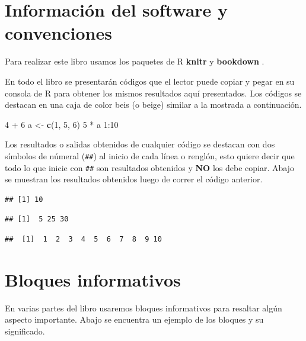 \documentclass[10pt,]{krantz}
\makeatletter
\newenvironment{Shaded}{\begin{snugshade}}{\end{snugshade}}
\newcommand{\KeywordTok}[1]{\textcolor[rgb]{0.13,0.29,0.53}{\textbf{{#1}}}}
\newcommand{\DecValTok}[1]{\textcolor[rgb]{0.00,0.00,0.81}{{#1}}}
\newcommand{\StringTok}[1]{\textcolor[rgb]{0.31,0.60,0.02}{{#1}}}
\newcommand{\NormalTok}[1]{{#1}}
\let\proglang=\textsf
\newenvironment{kframe}{%
\medskip{}
\setlength{\fboxsep}{.8em}
 \def\at@end@of@kframe{}%
 \ifinner\ifhmode%
  \def\at@end@of@kframe{\end{minipage}}%
  \begin{minipage}{\columnwidth}%
 \fi\fi%
 \def\FrameCommand##1{\hskip\@totalleftmargin \hskip-\fboxsep
 \colorbox{shadecolor}{##1}\hskip-\fboxsep
     \hskip-\linewidth \hskip-\@totalleftmargin \hskip\columnwidth}%
 \MakeFramed {\advance\hsize-\width
   \@totalleftmargin\z@ \linewidth\hsize
   \@setminipage}}%
 {\par\unskip\endMakeFramed%
 \at@end@of@kframe}
\renewenvironment{Shaded}{\begin{kframe}}{\end{kframe}}
\makeatother
\begin{document}
\section*{Información del software y
convenciones}\label{informacion-del-software-y-convenciones}


Para realizar este libro usamos los paquetes de \proglang{R}
\textbf{knitr} \citep{xie2015} y
\textbf{bookdown} \citep{R-bookdown}.

En todo el libro se presentarán códigos que el lector puede copiar y
pegar en su consola de \proglang{R} para obtener los mismos resultados
aquí presentados. Los códigos se destacan en una caja de color beis (o
beige) similar a la mostrada a continuación.

\begin{Shaded}
\begin{Highlighting}[]
\DecValTok{4} \NormalTok{+}\StringTok{ }\DecValTok{6}
\NormalTok{a <-}\StringTok{ }\KeywordTok{c}\NormalTok{(}\DecValTok{1}\NormalTok{, }\DecValTok{5}\NormalTok{, }\DecValTok{6}\NormalTok{)}
\DecValTok{5} \NormalTok{*}\StringTok{ }\NormalTok{a}
\DecValTok{1}\NormalTok{:}\DecValTok{10}
\end{Highlighting}
\end{Shaded}

Los resultados o salidas obtenidos de cualquier código se destacan con
dos símbolos de númeral (\texttt{\#\#}) al inicio de cada línea o
renglón, esto quiere decir que todo lo que inicie con \texttt{\#\#} son
resultados obtenidos y \textbf{NO} los debe copiar. Abajo se muestran
los resultados obtenidos luego de correr el código anterior.

\begin{verbatim}
## [1] 10
\end{verbatim}

\begin{verbatim}
## [1]  5 25 30
\end{verbatim}

\begin{verbatim}
##  [1]  1  2  3  4  5  6  7  8  9 10
\end{verbatim}

\section*{Bloques informativos}\label{bloques-informativos}


En varias partes del libro usaremos bloques informativos para resaltar
algún aspecto importante. Abajo se encuentra un ejemplo de los bloques y
su significado.
\end{document}
